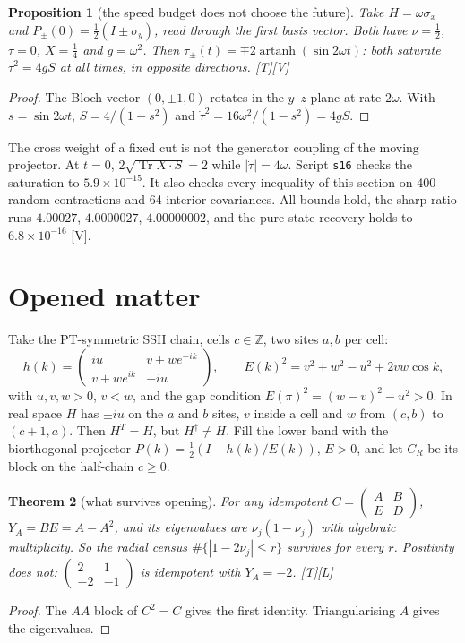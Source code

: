 \documentclass[11pt]{article}
\newtheorem{theorem}{Theorem}[section]
\newtheorem{proposition}[theorem]{Proposition}
\theoremstyle{definition}
\newcommand{\grade}[1]{\textsf{\small[#1]}}
\newcommand{\Tr}{\operatorname{Tr}}
\begin{document}
\begin{proposition}[the speed budget does not choose the future]\label{prop:joint}
Take $H=\omega\sigma_x$ and $P_\pm(0)=\tfrac12(I\pm\sigma_y)$, read through the first basis vector. Both have $\nu=\tfrac12$, $\tau=0$, $X=\tfrac14$ and $g=\omega^2$. Then $\tau_\pm(t)=\mp2\operatorname{artanh}(\sin2\omega t)$: both saturate $\dot\tau^2=4gS$ at all times, in opposite directions. \grade{T}\grade{V}
\end{proposition}
\begin{proof}
The Bloch vector $(0,\pm1,0)$ rotates in the $y$--$z$ plane at rate $2\omega$. With $s=\sin2\omega t$, $S=4/(1-s^2)$ and $\dot\tau^2=16\omega^2/(1-s^2)=4gS$.
\end{proof}
The cross weight of a fixed cut is not the generator coupling of the moving projector. At $t=0$, $2\sqrt{\Tr X\cdot S}=2$ while $|\dot\tau|=4\omega$. Script \texttt{s16} checks the saturation to $5.9\times10^{-15}$. It also checks every inequality of this section on 400 random contractions and 64 interior covariances. All bounds hold, the sharp ratio runs $4.00027$, $4.0000027$, $4.00000002$, and the pure-state recovery holds to $6.8\times10^{-16}$ \grade{V}.

\section{Opened matter}\label{sec:opened}
Take the PT-symmetric SSH chain, cells $c\in\mathbb Z$, two sites $a,b$ per cell:
\[
h(k)=\begin{pmatrix}iu&v+we^{-ik}\\ v+we^{ik}&-iu\end{pmatrix},\qquad E(k)^2=v^2+w^2-u^2+2vw\cos k,
\]
with $u,v,w>0$, $v<w$, and the gap condition $E(\pi)^2=(w-v)^2-u^2>0$. In real space $H$ has $\pm iu$ on the $a$ and $b$ sites, $v$ inside a cell and $w$ from $(c,b)$ to $(c+1,a)$. Then $H^T=H$, but $H^\dagger\ne H$. Fill the lower band with the biorthogonal projector $P(k)=\tfrac12(I-h(k)/E(k))$, $E>0$, and let $C_R$ be its block on the half-chain $c\ge0$.

\begin{theorem}[what survives opening]\label{thm:open}
For any idempotent $C=\begin{pmatrix}A&B\\E&D\end{pmatrix}$, $Y_A=BE=A-A^2$, and its eigenvalues are $\nu_j(1-\nu_j)$ with algebraic multiplicity. So the radial census $\#\{|1-2\nu_j|\le r\}$ survives for every $r$. Positivity does not: $\begin{pmatrix}2&1\\-2&-1\end{pmatrix}$ is idempotent with $Y_A=-2$. \grade{T}\grade{L}
\end{theorem}
\begin{proof}
The $AA$ block of $C^2=C$ gives the first identity. Triangularising $A$ gives the eigenvalues.
\end{proof}
\end{document}
